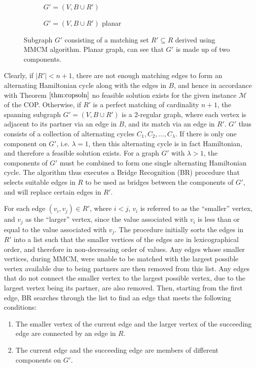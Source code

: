 \documentclass[oribibl]{llncs}
\begin{document}
\begin{figure}	
	\centering
	\begin{subfigure}[h]{0.4\textwidth}
		
		\caption{$G' = (V, B \cup R')$}	
		\label{fig:matching}
	\end{subfigure} \quad
	\begin{subfigure}[h]{0.5\textwidth}
		
		\caption{$G' =(V, B \cup R')$ planar}	
		\label{fig:mps}
	\end{subfigure}
	\caption{Subgraph $G'$ consisting of a matching set $R' \subseteq R$ derived using MMCM algorithm. Planar graph, can see that $G'$ is made up of two components.}
\end{figure}

Clearly, if $|R'| < n+1$, there are not enough matching edges to form an alternating Hamiltonian cycle along with the edges in $B$, and hence in accordance with Theorem $\ref{thm:copsoln}$ no feasible solution exists for the given instance $\mathcal{M}$ of the COP. Otherwise, if $R'$ is a perfect matching of cardinality $n+1$, the spanning subgraph $G'=(V, B \cup R')$ is a 2-regular graph, where each vertex is adjacent to its partner via an edge in $B$, and its match via an edge in $R'$. $G'$ thus consists of a collection of alternating cycles $C_1, C_2, ..., C_{\lambda}$. If there is only one component on $G'$, i.e. $\lambda = 1$, then this alternating cycle is in fact Hamiltonian, and therefore a feasible solution exists. For a graph $G'$ with $\lambda > 1$, the components of $G'$ must be combined to form one single alternating Hamiltonian cycle. The algorithm thus executes a Bridge Recognition (BR) procedure that selects suitable edges in $R$ to be used as bridges between the components of $G'$, and will replace certain edges in $R'$.

For each edge $(v_i, v_j) \in R'$, where $i < j$, $v_i$ is referred to as the ``smaller'' vertex, and $v_j$ as the ``larger'' vertex, since the value associated with $v_i$ is less than or equal to the value associated with $v_j$. The procedure initially sorts the edges in $R'$ into a list such that the smaller vertices of the edges are in lexicographical order, and therefore in non-decreasing order of values. Any edges whose smaller vertices, during MMCM, were unable to be matched with the largest possible vertex available due to being partners are then removed from this list. Any edges that do not connect the smaller vertex to the largest possible vertex, due to the largest vertex being its partner, are also removed. Then, starting from the first edge, BR searches through the list to find an edge that meets the following conditions:
\begin{enumerate}
	\item The smaller vertex of the current edge and the larger vertex of the succeeding edge are connected by an edge in $R$.
	\item The current edge and the succeeding edge are members of different components on $G'$.
\end{enumerate}
\end{document}
